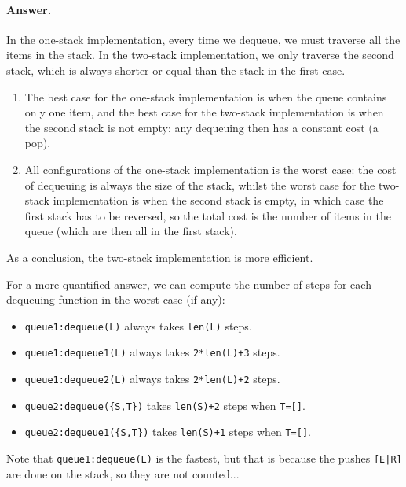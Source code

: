 \paragraph{Answer.} In the one-stack implementation, every time
we dequeue, we must traverse all the items in the stack. In the
two-stack implementation, we only traverse the second stack, which is
always shorter or equal than the stack in the first case.
\begin{enumerate}

  \item The best case for the one-stack implementation is when the
    queue contains only one item, and the best case for the two-stack
    implementation is when the second stack is not empty: any
    dequeuing then has a constant cost (a pop).

  \item All configurations of the one-stack implementation is the
    worst case: the cost of dequeuing is always the size of the stack,
    whilst the worst case for the two-stack implementation is when the
    second stack is empty, in which case the first stack has to be
    reversed, so the total cost is the number of items in the queue
    (which are then all in the first stack).

\end{enumerate}
As a conclusion, the two-stack implementation is more efficient.

\medskip

\noindent For a more quantified answer, we can compute the number of
steps for each dequeuing function in the worst case (if any):
\begin{itemize}

  \item \texttt{queue1:dequeue(L)} always takes \texttt{len(L)} steps. 

  \item \texttt{queue1:dequeue1(L)} always takes \texttt{2*len(L)+3} steps.

  \item \texttt{queue1:dequeue2(L)} always takes \texttt{2*len(L)+2} steps.

  \item \texttt{queue2:dequeue(\{S,T\})} takes \texttt{len(S)+2} steps when
    \texttt{T=[]}.

  \item \texttt{queue2:dequeue1(\{S,T\})} takes \texttt{len(S)+1} steps when
  \texttt{T=[]}.

\end{itemize}
Note that \texttt{queue1:dequeue(L)} is the fastest, but that is
because the pushes \verb:[E|R]: are done on the stack, so they are not
counted...
